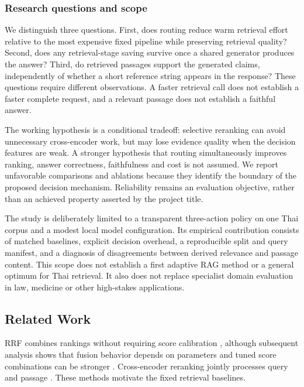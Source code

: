 \hypertarget{research-questions-and-scope}{%
\subsubsection{Research questions and
scope}\label{research-questions-and-scope}}

We distinguish three questions. First, does routing reduce warm
retrieval effort relative to the most expensive fixed pipeline while
preserving retrieval quality? Second, does any retrieval-stage saving
survive once a shared generator produces the answer? Third, do retrieved
passages support the generated claims, independently of whether a short
reference string appears in the response? These questions require
different observations. A faster retrieval call does not establish a
faster complete request, and a relevant passage does not establish a
faithful answer.

The working hypothesis is a conditional tradeoff: selective reranking
can avoid unnecessary cross-encoder work, but may lose evidence quality
when the decision features are weak. A stronger hypothesis that routing
simultaneously improves ranking, answer correctness, faithfulness and
cost is not assumed. We report unfavorable comparisons and ablations
because they identify the boundary of the proposed decision mechanism.
Reliability remains an evaluation objective, rather than an achieved
property asserted by the project title.

The study is deliberately limited to a transparent three-action policy
on one Thai corpus and a modest local model configuration. Its empirical
contribution consists of matched baselines, explicit decision overhead,
a reproducible split and query manifest, and a diagnosis of
disagreements between derived relevance and passage content. This scope
does not establish a first adaptive RAG method or a general optimum for
Thai retrieval. It also does not replace specialist domain evaluation in
law, medicine or other high-stakes applications.

\hypertarget{related-work}{%
\subsection{Related Work}\label{related-work}}

RRF combines rankings without requiring score calibration \citep{ref4},
although subsequent analysis shows that fusion behavior depends on
parameters and tuned score combinations can be stronger \citep{ref5}.
Cross-encoder reranking jointly processes query and passage
\citep{ref6}. These methods motivate the fixed retrieval baselines.

